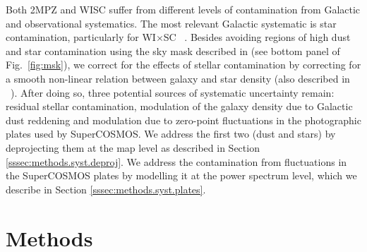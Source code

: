 \documentclass[useAMS,usenatbib]{mn2e}
\newcommand{\wisc}{WI$\times$SC}
\def\citejap#1{\citeauthor{#1}\ \citeyear{#1}}
\begin{document}
    Both 2MPZ and WISC suffer from different levels of contamination from Galactic and observational systematics. The most relevant Galactic systematic is star contamination, particularly for \wisc~ \citep{2018arXiv181208182X}. Besides avoiding regions of high dust and star contamination using the sky mask described in \cite{2018MNRAS.481.1133P} (see bottom panel of Fig.\!~\ref{fig:msk}), we correct for the effects of stellar contamination by correcting for a smooth non-linear relation between galaxy and star density (also described in \citejap{2018MNRAS.481.1133P}). After doing so, three potential sources of systematic uncertainty remain: residual stellar contamination, modulation of the galaxy density due to Galactic dust reddening and modulation due to zero-point fluctuations in the photographic plates used by SuperCOSMOS. We address the first two (dust and stars) by deprojecting them at the map level as described in Section \ref{sssec:methods.syst.deproj}. We address the contamination from fluctuations in the SuperCOSMOS plates by modelling it at the power spectrum level, which we describe in Section \ref{sssec:methods.syst.plates}.

\section{Methods}\label{sec:methods}
\end{document}
